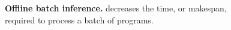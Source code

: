 \begin{figure}[t]
    \centering
    \vspace{-6mm}
    \caption{\small \textbf{Offline batch inference.} \text{\name} decreases the time, or makespan, required to process a batch of programs.}  
    \label{fig:offline-single-engine} 
    \vspace{-2mm}
\end{figure}

